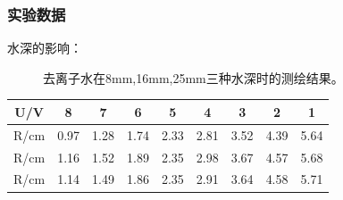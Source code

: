 \documentclass{beamer}
\begin{document}
    \begin{frame}
        \frametitle{实验数据}
        水深的影响：
        \begin{figure}
            \caption{去离子水在8mm,16mm,25mm三种水深时的测绘结果。}

        \end{figure}

        \begin{table}[width=\linewidth]
            \begin{tabular}{|c|c|c|c|c|c|c|c|c|}
            \hline
            U/V  & 8    & 7    & 6    & 5    & 4    & 3    & 2    & 1    \\ \hline
            R/cm & 0.97 & 1.28 & 1.74 & 2.33 & 2.81 & 3.52 & 4.39 & 5.64 \\ \hline
            R/cm & 1.16 & 1.52 & 1.89 & 2.35 & 2.98 & 3.67 & 4.57 & 5.68 \\ \hline
            R/cm & 1.14 & 1.49 & 1.86 & 2.35 & 2.91 & 3.64 & 4.58 & 5.71 \\ \hline
            \end{tabular}
        \end{table}
            
    \end{frame}
\end{document}
